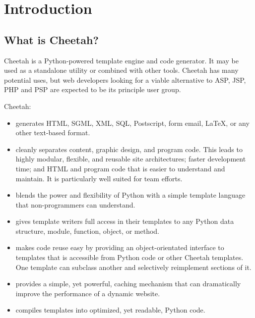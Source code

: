 \section{Introduction}
\label{intro}

\subsection{What is Cheetah?}
\label{intro.whatIs}

Cheetah is a Python-powered template engine and code generator.  It may be used
as a standalone utility or combined with other tools.  Cheetah has
many potential uses, but web developers looking for a viable alternative to ASP,
JSP, PHP and PSP are expected to be its principle user group.

Cheetah:
\begin{itemize}        
\item generates HTML, SGML, XML, SQL, Postscript, form email, LaTeX, or any
     other text-based format.
     
\item cleanly separates content, graphic design, and program code.  This leads
     to highly modular, flexible, and reusable site architectures; faster
     development time; and HTML and program code that is easier to understand
     and maintain. It is particularly well suited for team efforts.
     
\item blends the power and flexibility of Python with a simple template language
     that non-programmers can understand.
     
\item gives template writers full access in their templates to any Python data
     structure, module, function, object, or method.
     
\item makes code reuse easy by providing an object-orientated interface to
     templates that is accessible from Python code or other Cheetah templates.
     One template can subclass another and selectively reimplement sections of
     it.
     
\item provides a simple, yet powerful, caching mechanism that can dramatically
     improve the performance of a dynamic website.
     
\item compiles templates into optimized, yet readable, Python code.
\end{itemize}   

